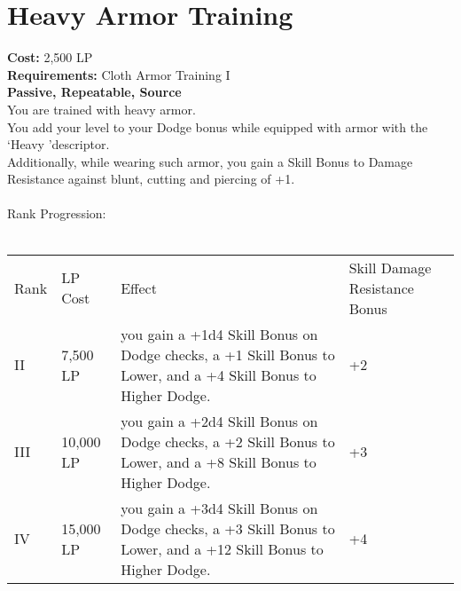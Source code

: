\section{Heavy Armor Training}\label{perk:heavyArmorTraining}
\textbf{Cost:} 2,500 LP\\
\textbf{Requirements:} Cloth Armor Training I\\
\textbf{Passive, Repeatable, Source}\\
You are trained with heavy armor.\\
You add your level to your Dodge bonus while equipped with armor with the \lq Heavy \rq descriptor.\\
Additionally, while wearing such armor, you gain a Skill Bonus to Damage Resistance against blunt, cutting and piercing of +1.\\
\\

Rank Progression:\\
\\
\begin{longtable}{l | l | l | p{9cm}}
    Rank & LP Cost & Effect & Skill Damage Resistance Bonus \\
    II
    & 7,500 LP
    & you gain a +1d4 Skill Bonus on Dodge checks, a +1 Skill Bonus to Lower, and a +4 Skill Bonus to Higher Dodge.
    & +2
    \\
    III
    & 10,000 LP
    & you gain a +2d4 Skill Bonus on Dodge checks, a +2 Skill Bonus to Lower, and a +8 Skill Bonus to Higher Dodge.
    & +3
    \\
    IV
    & 15,000 LP
    & you gain a +3d4 Skill Bonus on Dodge checks, a +3 Skill Bonus to Lower, and a +12 Skill Bonus to Higher Dodge.
    & +4
    \\
\end{longtable}